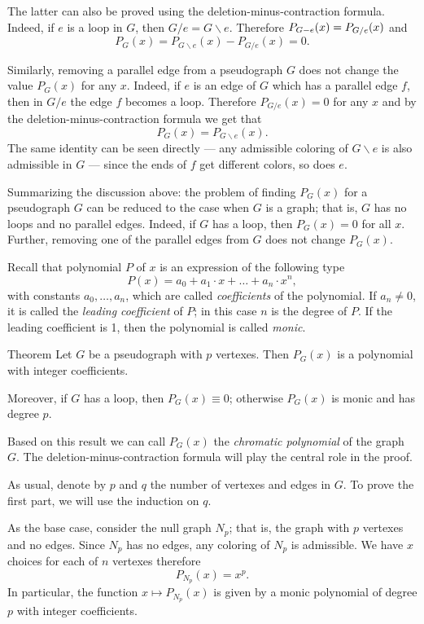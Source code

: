 The latter can also be proved using the deletion-minus-contraction formula.
Indeed, if $e$ is a loop in $G$, then $G/e=G\backslash e$.
Therefore $P_{G\backslash e}(x)\z=P_{G/e}(x)$ and
\[P_G(x)=P_{G\backslash e}(x)-P_{G/e}(x) =0.\]

Similarly, removing a parallel edge from a pseudograph $G$ does not change the value $P_G(x)$ for any $x$.
Indeed, if $e$ is an edge of $G$ which has a parallel edge $f$, then in $G/e$ the edge $f$ becomes a loop.
Therefore $P_{G/e}(x)=0$ for any $x$ and by the deletion-minus-contraction formula we get that
\[P_G(x)=P_{G\backslash e}(x).\]
The same identity can be seen directly --- any admissible coloring of $G\backslash e$ is also admissible in $G$ --- since the ends of $f$ get different colors, so does $e$. 

Summarizing the discussion above:
the problem of finding $P_G(x)$ for a pseudograph $G$ can be reduced to the case when $G$ is a graph; that is, $G$ has no loops and no parallel edges.
Indeed, if $G$ has a loop, then $P_G(x)=0$ for all $x$.
Further, removing one of the parallel edges from $G$ does not change $P_G(x)$.

Recall that polynomial $P$ of $x$ is an expression of the following type
\[P(x)=a_0+a_1\cdot x+\dots+a_n\cdot x^n,\]
with constants $a_0,\dots, a_n$, which are called {}\emph{coefficients} of the polynomial.
If $a_n\ne 0$, it is called the \emph{leading coefficient} of $P$;
in this case $n$ is the degree of $P$.
If the leading coefficient is 1, then the polynomial is called \emph{monic}.

\begin{thm}{Theorem}\label{thm:chromatic-polynomial}
Let $G$ be a pseudograph with $p$ vertexes.
Then $P_G(x)$ is a polynomial with integer coefficients.

Moreover, if $G$ has a loop, then $P_G(x)\equiv 0$;
otherwise $P_G(x)$ is monic and has degree $p$.
\end{thm}

Based on this result we can call $P_G(x)$ the \emph{chromatic polynomial} of the graph~$G$.
The deletion-minus-contraction formula will play the central role in the proof.

As usual, denote by $p$ and $q$ the number of vertexes and edges in $G$.
To prove the first part, we will use the induction on $q$.

As the base case, consider the null graph $N_p$;
that is, the graph with $p$ vertexes and no edges.
Since $N_p$ has no edges, any coloring of $N_p$ is admissible.
We have $x$ choices for each of $n$ vertexes therefore
\[P_{N_p}(x)=x^p.\]
In particular, the function $x\mapsto P_{N_p}(x)$ is given by a monic polynomial of degree $p$ with integer coefficients.

